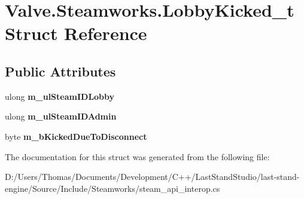 \hypertarget{structValve_1_1Steamworks_1_1LobbyKicked__t}{}\section{Valve.\+Steamworks.\+Lobby\+Kicked\+\_\+t Struct Reference}
\label{structValve_1_1Steamworks_1_1LobbyKicked__t}
\subsection*{Public Attributes}
\begin{DoxyCompactItemize}
\item 
\hypertarget{structValve_1_1Steamworks_1_1LobbyKicked__t_aeccbe3b86432b4e87b140a2f83aefedb}{}ulong {\bfseries m\+\_\+ul\+Steam\+I\+D\+Lobby}\label{structValve_1_1Steamworks_1_1LobbyKicked__t_aeccbe3b86432b4e87b140a2f83aefedb}

\item 
\hypertarget{structValve_1_1Steamworks_1_1LobbyKicked__t_a8e2d3ffcc0ea790af43da93f8f468f4d}{}ulong {\bfseries m\+\_\+ul\+Steam\+I\+D\+Admin}\label{structValve_1_1Steamworks_1_1LobbyKicked__t_a8e2d3ffcc0ea790af43da93f8f468f4d}

\item 
\hypertarget{structValve_1_1Steamworks_1_1LobbyKicked__t_abc6b6b2efec2502caf943e729e6a6a09}{}byte {\bfseries m\+\_\+b\+Kicked\+Due\+To\+Disconnect}\label{structValve_1_1Steamworks_1_1LobbyKicked__t_abc6b6b2efec2502caf943e729e6a6a09}

\end{DoxyCompactItemize}


The documentation for this struct was generated from the following file\+:\begin{DoxyCompactItemize}
\item 
D\+:/\+Users/\+Thomas/\+Documents/\+Development/\+C++/\+Last\+Stand\+Studio/last-\/stand-\/engine/\+Source/\+Include/\+Steamworks/steam\+\_\+api\+\_\+interop.\+cs\end{DoxyCompactItemize}
